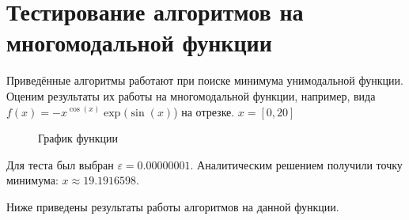 \documentclass[12pt, a4paper]{article}
\begin{document}
    \section{Тестирование алгоритмов на многомодальной функции}\label{sec:тестирование-алгоритмов-на-многомодальной-функции}
    {Приведённые алгоритмы работают при поиске минимума унимодальной функции.
    Оценим результаты их работы на многомодальной функции, например, вида $f(x)=-x^{\cos(x)}\exp(\sin(x)$) на отрезке. \(x = \left[0, 20\right]\)}

    \begin{figure}[h]
        \caption{График функции}
        \label{fig:image}
    \end{figure}
    \noindent
    {Для теста был выбран $\varepsilon=0.00000001$.
    Аналитическим решением получили точку минимума: $x \approx 19.1916598$.}

    {Ниже приведены результаты работы алгоритмов на данной функции.}
\end{document}
